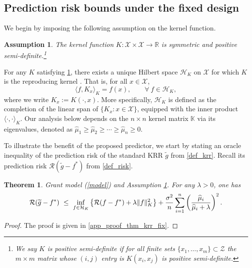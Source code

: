 \documentclass[11pt,twoside]{article}
\newtheorem{theorem}{Theorem}
\newtheorem{assumption}{Assumption}
\def\KK{\mathbb{K}}
\def\RR{\mathbb{R}}
\def\cH{\mathcal H}
\def\cR{\mathcal R}
\def\cZ{\mathcal Z}
\def\cX{\mathcal{X}}
\def\wh{\widehat}
\def\wt{\widetilde}
\begin{document}
\subsection{Prediction risk bounds under the fixed design}\label{sec_theory_fixed}



We begin by imposing the following assumption on the kernel function. 
\begin{assumption}\label{ass_pd_K}
    The kernel function $K:{ \cX \times \cX} \to \RR$ is   symmetric and positive semi-definite.\footnote{We say $K$ is positive semi-definite if for all finite sets $\{x_1,\ldots,x_m\}\subset \cZ$ the $m\times m$ matrix  whose $(i,j)$ entry is $K(x_i, x_j)$ is positive semi-definite.} 
\end{assumption}
For any $K$ satisfying \cref{ass_pd_K}, there exists a unique Hilbert space $\cH_K$ on $\cX$ for which $K$ is the reproducing kernel \citep{Aronszajn1950}. That is, for all $x \in \cX$,
\begin{equation}\label{reproducing}
\langle f, K_x \rangle_K = f(x), \qquad \forall~ f \in \cH_K,
\end{equation}
where we write $K_x := K(\cdot, x)$. More specifically, $\cH_K$ is defined as the completion of the linear span of $\{K_x : x \in \cX\}$, equipped with the inner product $\langle \cdot, \cdot \rangle_K$. Our analysis below depends on the $n\times n$ kernel matrix $\KK$ via its eigenvalues, denoted as  $\wh {\mu}_1 \ge \wh {\mu}_2 \ge \cdots\ge \wh {\mu}_n\ge0$.

To illustrate the benefit of the proposed predictor, we start by stating an oracle inequality of the prediction risk of the standard KRR $\wt g$ from \eqref{def_krr}.  Recall its prediction risk $\cR(\wt g-f^*)$ from  \eqref{def_risk}. 

\begin{theorem}\label{thm_krr_fix}
    Grant model (\ref{model}) and
    Assumption   \ref{ass_pd_K}.  For any $\lambda >0$, one has 
    \begin{equation}\label{rate_krr_fix}
        \cR(\wt g-f^*) ~ \le ~    \inf_{f\in \cH_K}\left\{  \cR(f-f^*) + \lambda \|f\|_K^2  \right\}+ {\sigma^2  \over n}  \sum_{i=1}^n\left(\wh \mu_i\over \wh \mu_i + \lambda\right)^2.
    \end{equation}
\end{theorem}
\begin{proof}
    The proof is given in \cref{app_proof_thm_krr_fix}.
\end{proof}
\end{document}
